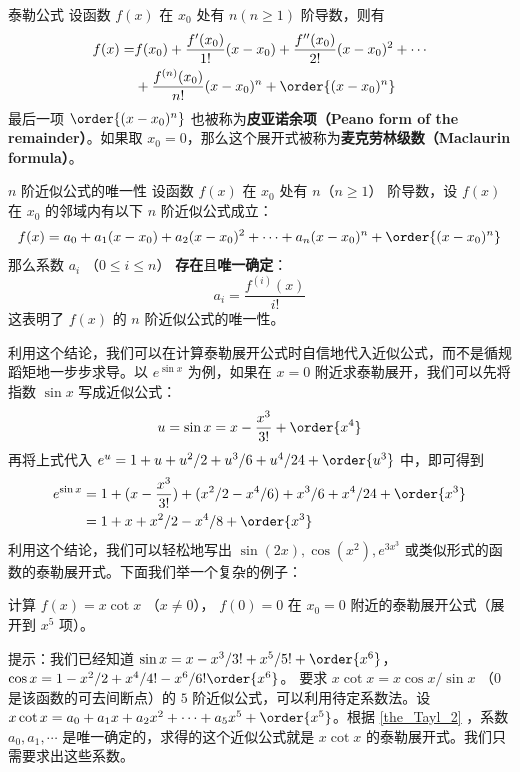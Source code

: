 
\begin{theorem}{泰勒公式}\label{the_Tayl_1}
设函数 $f(x)$ 在 $x_0$ 处有 $n(n\ge 1)$ 阶导数，则有
\begin{equation}\label{eq_Tayl_2}
\begin{aligned}
f(x)=&f(x_0)+\frac{f'(x_0)}{1!}(x-x_0)+\frac{f''(x_0)}{2!}(x-x_0)^2+\cdots\\
&+\frac{f^{(n)}(x_0)}{n!}(x-x_0)^n+\order{(x-x_0)^n}
\end{aligned}
\end{equation}
最后一项 $\order{(x-x_0)^n}$ 也被称为\textbf{皮亚诺余项（Peano form of the remainder）}。如果取 $x_0=0$，那么这个展开式被称为\textbf{麦克劳林级数（Maclaurin formula）}。
\end{theorem}
\begin{theorem}{$n$ 阶近似公式的唯一性}\label{the_Tayl_2}
设函数 $f(x)$ 在 $x_0$ 处有 $n$（$n\ge 1$） 阶导数，设 $f(x)$ 在 $x_0$ 的邻域内有以下 $n$ 阶近似公式成立：
\begin{equation}
\begin{aligned}
f(x)=a_0+a_1(x-x_0)+a_2(x-x_0)^2+\cdots+a_n(x-x_0)^n+\order{(x-x_0)^n}
\end{aligned}
\end{equation}
那么系数 $a_i$ （$0\le i\le n$） \textbf{存在}且\textbf{唯一确定}：
\begin{equation}
a_i=\frac{f^{(i)}(x)}{i!}
\end{equation}
这表明了 $f(x)$ 的 $n$ 阶近似公式的唯一性。
\end{theorem}
利用这个结论，我们可以在计算泰勒展开公式时自信地代入近似公式，而不是循规蹈矩地一步步求导。以 $e^{\sin x}$ 为例，如果在 $x=0$ 附近求泰勒展开，我们可以先将指数 $\sin x$ 写成近似公式：
\begin{equation}
u=\sin x=x-\frac{x^3}{3!}+\order{x^4}
\end{equation}
再将上式代入 $e^u=1+u+u^2/2+u^3/6+u^4/24+\order{u^3}$ 中，即可得到
\begin{equation}
\begin{aligned}
e^{\sin x}&=1+(x-\frac{x^3}{3!})+(x^2/2-x^4/6)+x^3/6+x^4/24+\order{x^3}
\\&=1+x+x^2/2-x^4/8+\order{x^3}
\end{aligned}
\end{equation}
利用这个结论，我们可以轻松地写出 $\sin (2x),\cos(x^2),e^{3x^3}$ 或类似形式的函数的泰勒展开式。下面我们举一个复杂的例子：
\begin{exercise}{}
计算 $f(x)=x\cot x$ （$x\neq 0$）， $f(0)=0$ 在 $x_0=0$ 附近的泰勒展开公式（展开到 $x^5$ 项）。
\end{exercise}
提示：我们已经知道 $\sin x=x-x^3/3!+x^5/5!+\order{x^6}$， $\cos x=1-x^2/2+x^4/4!-x^6/6!\order{x^6}$。 要求 $x\cot x=x\cos x/\sin x$ （$0$ 是该函数的可去间断点）的 $5$ 阶近似公式，可以利用待定系数法。设 $x\cot x=a_0+a_1 x+a_2 x^2+\cdots+ a_5 x^5 + \order{x^5}$。根据 \autoref{the_Tayl_2}  ，系数 $a_0,a_1,\cdots$ 是唯一确定的，求得的这个近似公式就是 $x\cot x$ 的泰勒展开式。我们只需要求出这些系数。


